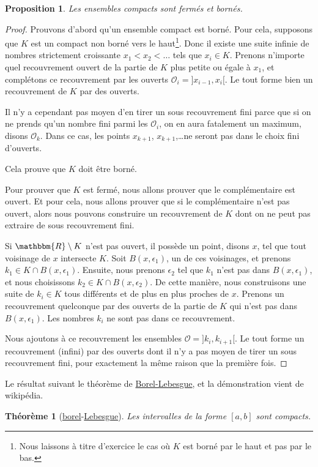 \documentclass[a4paper,12pt]{book}
\newcommand{\eR}{\mathbbm{R}}
\newcounter{numtho}
\theoremstyle{mes_exemples}	\newtheorem{exemple}[numtho]{Exemple}
\theoremstyle{mes_tho}
\newtheorem{proposition}[numtho]{Proposition}
\newtheorem{theorem}[numtho]{Théorème}
\newcommand{\mO}{\mathcal{O}}
\begin{document}
\begin{proposition}
Les ensembles compacts sont fermés et bornés.
\end{proposition}

\begin{proof}
Prouvons d'abord qu'un ensemble compact est borné. Pour cela, supposons que $K$ est un compact non borné vers le haut\footnote{Nous laissons à titre d'exercice le cas où $K$ est borné par le haut et pas par le bas.}. Donc il existe une suite infinie de nombres strictement croissante $x_1<x_2<\ldots$ tels que $x_i\in K$. Prenons n'importe quel recouvrement ouvert de la partie de $K$ plus petite ou égale à $x_1$, et complétons ce recouvrement par les ouverts $\mO_i=]x_{i-1},x_i[$. Le tout forme bien un recouvrement de $K$ par des ouverts. 

Il n'y a cependant pas moyen d'en tirer un sous recouvrement fini parce que si on ne prends qu'un nombre fini parmi les $\mO_i$, on en aura fatalement un maximum, disons $\mO_k$. Dans ce cas, les points $x_{k+1}$, $x_{k+1}$,\ldots ne seront pas dans le choix fini d'ouverts.

Cela prouve que $K$ doit être borné.

Pour prouver que $K$ est fermé, nous allons prouver que le complémentaire est ouvert. Et pour cela, nous allons prouver que si le complémentaire n'est pas ouvert, alors nous pouvons construire un recouvrement de $K$ dont on ne peut pas extraire de sous recouvrement fini.

Si $\eR\setminus K$ n'est pas ouvert, il possède un point, disons $x$, tel que tout voisinage de $x$ intersecte $K$. Soit $B(x,\epsilon_1)$, un de ces voisinages, et prenons $k_1\in K\cap B(x,\epsilon_1)$. Ensuite, nous prenons $\epsilon_2$ tel que $k_1$ n'est pas dans $B(x,\epsilon_1)$, et nous choisissons $k_2\in K\cap B(x,\epsilon_2)$. De cette manière, nous construisons une suite de $k_i\in K$ tous différents et de plus en plus proches de $x$. Prenons un recouvrement quelconque par des ouverts de la partie de $K$ qui n'est pas dans $B(x,\epsilon_1)$. Les nombres $k_i$ ne sont pas dans ce recouvrement.

Nous ajoutons à ce recouvrement les ensembles $\mO=]k_i,k_{i+1}[$. Le tout forme un recouvrement (infini) par des ouverts dont il n'y a pas moyen de tirer un sous recouvrement fini, pour exactement la même raison que la première fois.
\end{proof}

Le résultat suivant le théorème de \href{http://fr.wikipedia.org/wiki/Théorème_de_Heine-Borel}{Borel-Lebesgue}, et la démonstration vient de wikipédia.
\begin{theorem}[\href{http://fr.wikipedia.org/wiki/Émile_Borel}{borel}-\href{http://fr.wikipedia.org/wiki/Henri_Léon_Lebesgue}{Lebesgue}]	\label{ThoBOrelLebesgue}
	Les intervalles de la forme $[a,b]$ sont compacts.
\end{theorem}
\end{document}
